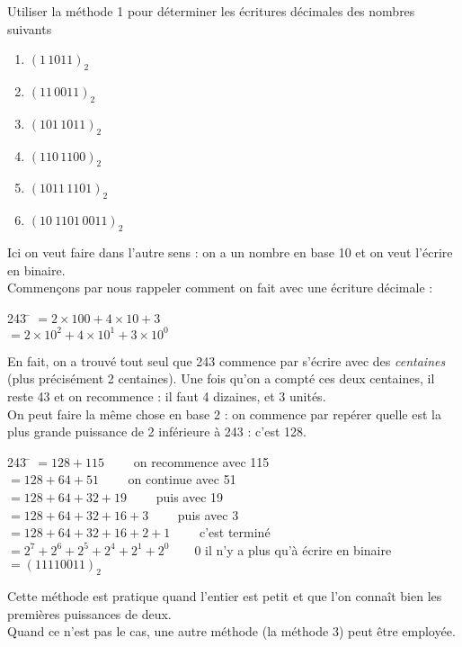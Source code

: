 \documentclass[a4paper,12pt,french]{book}
\begin{document}
\begin{exercice}[]
Utiliser la méthode 1 pour déterminer les écritures décimales des nombres suivants
\begin{multicols}{3}
\begin{enumerate}[\bfseries 1.]
	\item 	$(1\,1011)_2$
	\item 	$(11\,0011)_2$
	\item 	$(101\,1011)_2$
	\item 	$(110\,1100)_2$
	\item 	$(1011\,1101)_2$
	\item 	$(10\ 1101\,0011)_2$
\end{enumerate}
\end{multicols}
\end{exercice}
\begin{methode}
Ici on veut faire \og dans l'autre sens\fg{} : on a un nombre en base 10 et on veut l'écrire en binaire.\\
Commençons par nous rappeler comment on fait avec une écriture décimale :
			\begin{tabbing}
				243	\= 	$=2\times 100+4\times 10 +3$	\\
				
					\>	$=2\times 10^2+4\times 10^1+3\times 10^0$
			\end{tabbing}
En fait, on a trouvé tout seul que 243 commence par s'écrire avec des \textit{centaines} (plus précisément 2 centaines).
Une fois qu'on a compté ces deux centaines, il reste 43 et on recommence : il faut 4 dizaines, et 3 unités.\\


On peut faire la même chose en base 2 : on commence par repérer quelle est la plus grande puissance de 2 inférieure à 243 : c'est 128.
			\begin{tabbing}
				243	\= 	$=128+115\qquad$ on recommence avec 115\\
				
				
					\>	$=128+64+51\qquad$ on continue avec 51\\
					
					\>	$=128+64+32+19\qquad$ puis avec 19	\\
					
					\>	$=128+64+32+16+3\qquad$ puis avec 3	\\
							
					\>	$=128+64+32+16+2+1\qquad$ c'est terminé	\\
														
					\> $=2^7+2^6+2^5+2^4+2^1+2^0\qquad0$ il n'y a plus qu'à écrire en binaire\\
					
					\> $=(11110011)_2$
			\end{tabbing}
			Cette méthode est pratique quand l'entier est petit et que l'on connaît bien les premières puissances de deux.\\
			Quand ce n'est pas le cas, une autre méthode (la méthode 3) peut être employée.	
\end{methode}
\end{document}
